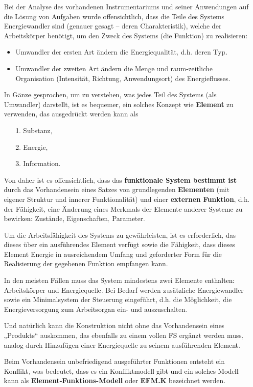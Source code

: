 \documentclass[11pt,a4paper]{article}
\begin{document}
Bei der Analyse des vorhandenen Instrumentariums und seiner Anwendungen auf
die Lösung von Aufgaben wurde offensichtlich, dass die Teile des Systems
Energiewandler sind (genauer gesagt -- deren Charakteristik), welche der
Arbeitskörper benötigt, um den Zweck des Systems (die Funktion) zu
realisieren:
\begin{itemize}
\item Umwandler der ersten Art ändern die Energiequalität, d.h. deren Typ.
\item Umwandler der zweiten Art ändern die Menge und raum-zeitliche
  Organisation (Intensität, Richtung, Anwendungsort) des Energieflusses.
\end{itemize}
In Gänze gesprochen, um zu verstehen, was jedes Teil des Systems (als
Umwandler) darstellt, ist es bequemer, ein solches Konzept wie
\textbf{Element} zu verwenden, das ausgedrückt werden kann als
\begin{itemize}
\item[1.] Substanz,
\item[2.] Energie,
\item[3.] Information.
\end{itemize}
Von daher ist es offensichtlich, dass das \textbf{funktionale System bestimmt
  ist} durch das Vorhandensein eines Satzes von grundlegenden
\textbf{Elementen} (mit eigener Struktur und innerer Funktionalität) und einer
\textbf{externen Funktion}, d.h. der Fähigkeit, eine Änderung eines Merkmals
der Elemente anderer Systeme zu bewirken: Zustände, Eigenschaften, Parameter.

Um die Arbeitsfähigkeit des Systems zu gewährleisten, ist es erforderlich, das
dieses über ein ausführendes Element verfügt sowie die Fähigkeit, dass dieses
Element Energie in ausreichendem Umfang und geforderter Form für die
Realisierung der gegebenen Funktion empfangen kann.

In den meisten Fällen muss das System mindestens zwei Elemente enthalten:
Arbeitskörper und Energiequelle. Bei Bedarf werden zusätzliche Energiewandler
sowie ein Minimalsystem der Steuerung eingeführt, d.h. die Möglichkeit, die
Energieversorgung zum Arbeitsorgan ein- und auszuschalten.

Und natürlich kann die Konstruktion nicht ohne das Vorhandensein eines
„Produkts“ auskommen, das ebenfalls zu einem vollen FS ergänzt werden muss,
analog durch Hinzufügen einer Energiequelle zu seinem ausführenden Element.

Beim Vorhandensein unbefriedigend ausgeführter Funktionen entsteht ein
Konflikt, was bedeutet, dass es ein Konfliktmodell gibt und ein solches Modell
kann als \textbf{Element-Funktions-Modell} oder \textbf{EFM.K} bezeichnet
werden.
\end{document}
